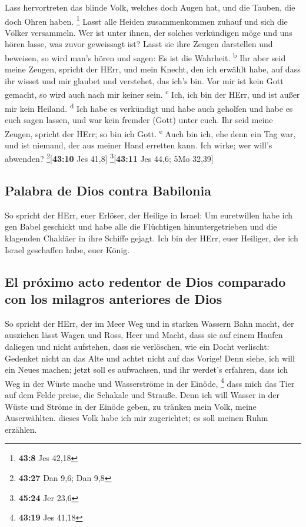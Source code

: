  Lass hervortreten das blinde Volk, welches doch Augen
hat, und die Tauben, die doch Ohren haben. \footnote{\textbf{43:8} Jes
  42,18}  Lasst alle Heiden zusammenkommen zuhauf und sich
die Völker versammeln. Wer ist unter ihnen, der solches verkündigen möge
und uns hören lasse, was zuvor geweissagt ist? Lasst sie ihre Zeugen
darstellen und beweisen, so wird man's hören und sagen: Es ist die
Wahrheit. \textsuperscript{b}  Ihr aber seid meine
Zeugen, spricht der HErr, und mein Knecht, den ich erwählt habe, auf
dass ihr wisset und mir glaubet und verstehet, das ich's bin. Vor mir
ist kein Gott gemacht, so wird auch nach mir keiner sein.
\textsuperscript{c}  Ich, ich bin der HErr, und ist außer
mir kein Heiland. \textsuperscript{d}  Ich habe es
verkündigt und habe auch geholfen und habe es euch sagen lassen, und war
kein fremder (Gott) unter euch. Ihr seid meine Zeugen, spricht der HErr;
so bin ich Gott. \textsuperscript{e}  Auch bin ich, ehe
denn ein Tag war, und ist niemand, der aus meiner Hand erretten kann.
Ich wirke; wer will's abwenden? \footnote{\textbf{43:27} Dan 9,6; Dan
  9,8}{[}\textbf{43:10} Jes 41,8{]} \footnote{\textbf{45:24} Jer 23,6}{[}\textbf{43:11}
Jes 44,6; 5Mo 32,39{]}

\hypertarget{palabra-de-dios-contra-babilonia}{%
\subsection{Palabra de Dios contra
Babilonia}\label{palabra-de-dios-contra-babilonia}}

 So spricht der HErr, euer Erlöser, der Heilige in
Israel: Um euretwillen habe ich gen Babel geschickt und habe alle die
Flüchtigen hinuntergetrieben und die klagenden Chaldäer in ihre Schiffe
gejagt.  Ich bin der HErr, euer Heiliger, der ich Israel
geschaffen habe, euer König.

\hypertarget{el-pruxf3ximo-acto-redentor-de-dios-comparado-con-los-milagros-anteriores-de-dios}{%
\subsection{El próximo acto redentor de Dios comparado con los milagros
anteriores de
Dios}\label{el-pruxf3ximo-acto-redentor-de-dios-comparado-con-los-milagros-anteriores-de-dios}}

 So spricht der HErr, der im Meer Weg und in starken
Wassern Bahn macht,  der ausziehen lässt Wagen und Ross,
Heer und Macht, dass sie auf einem Haufen daliegen und nicht aufstehen,
dass sie verlöschen, wie ein Docht verlischt:  Gedenket
nicht an das Alte und achtet nicht auf das Vorige!  Denn
siehe, ich will ein Neues machen; jetzt soll es aufwachsen, und ihr
werdet's erfahren, dass ich Weg in der Wüste mache und Wasserströme in
der Einöde, \footnote{\textbf{43:19} Jes 41,18}  dass
mich das Tier auf dem Felde preise, die Schakale und Strauße. Denn ich
will Wasser in der Wüste und Ströme in der Einöde geben, zu tränken mein
Volk, meine Auserwählten.  dieses Volk habe ich mir
zugerichtet; es soll meinen Ruhm erzählen.

